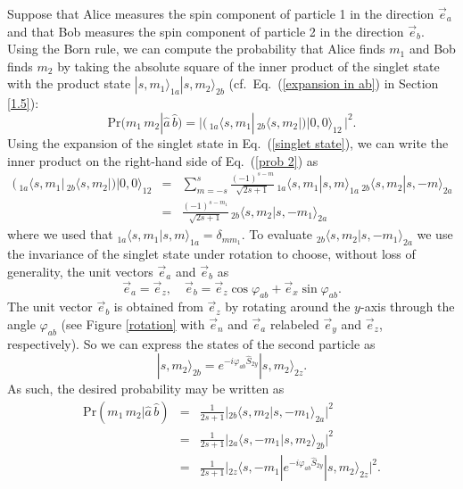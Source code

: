Suppose that Alice measures the spin component of particle 1 in the direction $\vec{e}_a$ and that Bob measures the spin component of particle 2 in the direction $\vec{e}_b$. Using the Born rule, we can compute the probability that Alice finds $m_1$ and Bob finds $m_2$ by taking the absolute square of the inner product of the singlet state with the product state $|s, m_1 \rangle_{1a} |s, m_2 \rangle_{2b}$ (cf.\ Eq.\ (\ref{expansion in ab}) in Section \ref{1.5}): 
\begin{equation}
\mathrm{Pr}(m_1\, m_2 | \hat{a}\,\hat{b} ) = \Big| \Big(  \,\! _{1a\!}\langle s, m_1| \, _{2b\!}\langle s, m_2 | \Big)| 0, 0\rangle_{\! 12}\, \Big|^{2\!}.
\label{prob 2}
\end{equation} 
Using the expansion of the singlet state in Eq.\ (\ref{singlet state}), we can write the inner product on the right-hand side of Eq.\ (\ref{prob 2}) as
\begin{eqnarray}
\Big(  \,\! _{1a\!}\langle s, m_1| \, _{2b\!}\langle s, m_2 | \Big)| 0, 0\rangle_{\! 12}
&\!\!\!=\!\!\!& \sum_{m=-s}^{s} \frac{(-1)^{s-m}}{\sqrt{2s+1}} \,
_{1a\!}\langle s, m_1|s,m\rangle_{1a} \,
_{2b\!}\langle s, m_2 |s,-m\rangle_{2a} \nonumber \\
&\!\!\!=\!\!\!& \frac{(-1)^{s-m_1}}{\sqrt{2s+1}} \,
_{2b\!}\langle s, m_2 |s,-m_1\rangle_{2a}
\label{inner product 1}
\end{eqnarray}
where we used that $_{1a \!}\langle s, m_1 | s, m \rangle_{1a} = \delta_{mm_1}$. To evaluate $_{2b\!}\langle s, m_2 |s,-m_1\rangle_{2a}$ we use the invariance of the singlet state under rotation to choose, without loss of generality, the unit vectors $\vec{e}_a$ and $\vec{e}_b$ as
\begin{equation}
\vec{e}_a=\vec{e}_z,\quad \vec{e}_b=\vec{e}_z \cos\varphi_{ab}+\vec{e}_x\sin\varphi_{ab}.
\label{vector dirs 2}
\end{equation}
The unit vector $\vec{e}_b$ is obtained from $\vec{e}_z$ by rotating around the $y$-axis through the angle $\varphi_{ab}$ (see Figure \ref{rotation} with $\vec{e}_n$ and $\vec{e}_a$ relabeled $\vec{e}_y$ and $\vec{e}_z$, respectively). So we can express the states of the second particle as
\begin{equation}
|s,m_2\rangle_{2b} = e^{-i \varphi_{ab} \hat{S}_{2y}}|s,m_2\rangle_{2z}.
\label{rotated 2nd particle states}
\end{equation}
As such, the desired probability may be written as
\begin{eqnarray}
\mathrm{Pr}(m_1\, m_2 | \hat{a}\,\hat{b} )
&\!\!=\!\!& \frac{1}{2s+1} \Big| {_{2b\!}}\langle s, m_2 |s,-m_1\rangle_{2a}\Big|^{\!2} \nonumber \\[.3 cm]
&\!\!=\!\!& \frac{1}{2s+1} \Big| {_{2a\!}}\langle s, -m_1 |s,m_2\rangle_{2b}\Big|^{\!2} \nonumber \\[.3 cm]
&\!\!=\!\!& \frac{1}{2s+1} \Big| {_{2z\!}}\langle s, -m_1| e^{-i \varphi_{ab}\hat{S}_{2y}}|s,m_2\rangle_{2z}\Big|^{\!2}.
\label{inner product 2}
\end{eqnarray}
